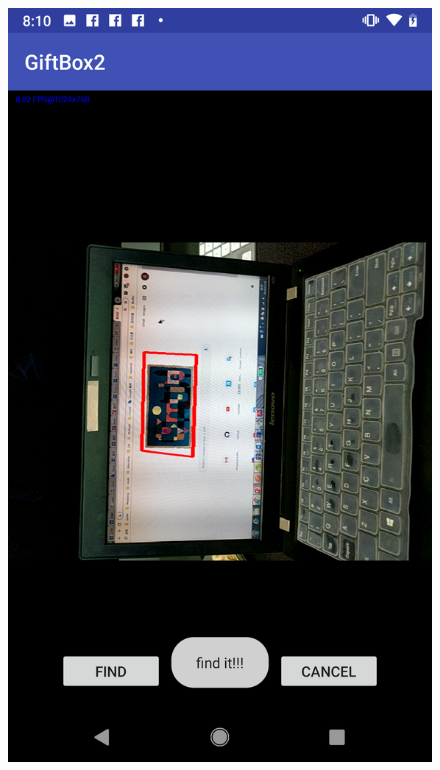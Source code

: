 \begin{figure}[htb]
\begin{minipage}[H]{0.3\textwidth}
\includegraphics[width=.95\textwidth]{section05/assets/resultExample3.png}
\subcaption{\label{DetectedRegionCorrect1}}
\end{minipage}%


\end{figure}
